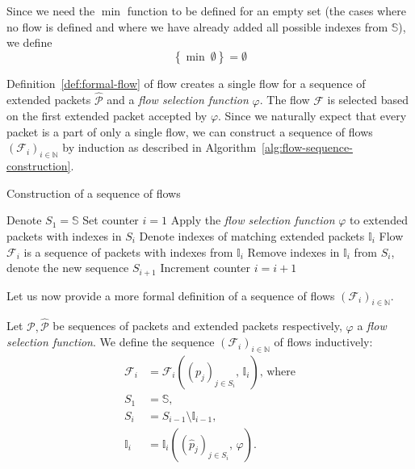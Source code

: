Since we need the $\min$ function to be defined for an empty set (the cases where no flow is defined and where we have already added all possible indexes from $\mathbb{S}$), we define
\begin{equation*}
    \left\{\min\ \emptyset \right\} = \emptyset
\end{equation*}

Definition~\ref{def:formal-flow} of flow creates a single flow for a sequence of extended packets $\widehat{\mathcal{P}}$ and a \emph{flow selection function} $\varphi$. The flow $\mathcal{F}$ is selected based on the first extended packet accepted by $\varphi$. Since we naturally expect that every packet is a part of only a single flow, we can construct a sequence of flows $(\mathcal{F}_i)_{i \in \mathbb{N}}$ by induction as described in Algorithm~\ref{alg:flow-sequence-construction}.

\begin{algorithm}
    \caption{Construction of a sequence of flows}
    \label{alg:flow-sequence-construction}
    \begin{algorithmic}[1]
        \STATE Denote $S_1 = \mathbb{S}$
        \STATE Set counter $i = 1$
        \REPEAT
            \STATE Apply the \emph{flow selection function} $\varphi$ to extended packets with indexes in $S_i$
            \STATE Denote indexes of matching extended packets $\mathbb{I}_i$
            \STATE Flow $\mathcal{F}_i $ is a sequence of packets with indexes from $\mathbb{I}_i$
            \STATE Remove indexes in $\mathbb{I}_i$ from $S_i$, denote the new sequence $S_{i+1}$
            \STATE Increment counter $i = i + 1$
    \end{algorithmic}
\end{algorithm}

Let us now provide a more formal definition of a sequence of flows $(\mathcal{F}_i)_{i \in \mathbb{N}}$.
\begin{defn}\label{def:formal-flow-sequence}
Let $\mathcal{P}, \widehat{\mathcal{P}}$ be sequences of packets and extended packets respectively, $\varphi$ a \emph{flow selection function}. We define the sequence $(\mathcal{F}_i)_{i \in \mathbb{N}}$ of flows inductively:
\begin{align*}
    \mathcal{F}_i &= \mathcal{F}_i\left((p_j)_{j\in S_i},\, \mathbb{I}_i\right) \text{, where} \\
    S_1 &= \mathbb{S}, \\
    S_i &= S_{i-1} \setminus \mathbb{I}_{i-1}, \\
    \mathbb{I}_{i} &= \mathbb{I}_i\left((\widehat{p}_j)_{j \in S_i},\, \varphi\right).
\end{align*}
\end{defn}

